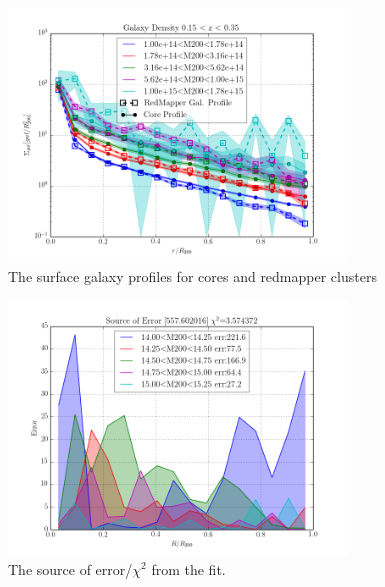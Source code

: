 \documentclass[twocolumn]{article}
\begin{document}
\begin{figure}[H]
  \center\includegraphics[width=0.8\textwidth]{figs/cfn/basic_rd.param/plot_zmrs.py/fig1.png}
  \caption{The surface galaxy profiles for cores and redmapper clusters}
  \label{fig:basic_rd:profile}
\end{figure}

\begin{figure}[H]
  \center\includegraphics[width=0.8\textwidth]{figs/cfn/basic_rd.param/plot_zmrs.py/fig9.png}
  \caption{The source of error/$\chi^{2}$ from the fit. }
  \label{fig:basic_rd:error}
\end{figure}
\end{document}
